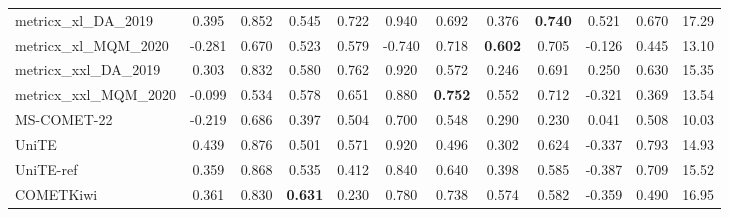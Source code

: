 \documentclass[11pt]{article}
\begin{document}
\begin{sidewaystable*}[ht]
\begin{tabular}{@{}lccccccccccc@{}}
metricx\_xl\_DA\_2019   & \phantom{-}0.395    & \phantom{-}0.852    & \phantom{-}0.545          & \phantom{-}0.722        & \phantom{-}0.940            & \phantom{-}0.692           & \phantom{-}0.376            & \colorbox[HTML]{B2EAB1}{\textbf{\phantom{-}0.740}}                & \phantom{-}0.521          & \phantom{-}0.670       & 17.29      \\
metricx\_xl\_MQM\_2020  & -0.281   & \phantom{-}0.670    & \phantom{-}0.523          & \phantom{-}0.579        & {-}0.740            & \phantom{-}0.718           & \colorbox[HTML]{B2EAB1}{\textbf{\phantom{-}0.602}}            & \phantom{-}0.705                & -0.126         & \phantom{-}0.445       & 13.10      \\
metricx\_xxl\_DA\_2019  & \phantom{-}0.303    & \phantom{-}0.832    & \phantom{-}0.580          & \phantom{-}0.762        & \phantom{-}0.920            & \phantom{-}0.572           & \phantom{-}0.246            & \phantom{-}0.691                & \phantom{-}0.250          & \phantom{-}0.630       & 15.35      \\
metricx\_xxl\_MQM\_2020 & -0.099   & \phantom{-}0.534    & \phantom{-}0.578          & \phantom{-}0.651        & \phantom{-}0.880            & \colorbox[HTML]{B2EAB1}{\textbf{\phantom{-}0.752}}           & \phantom{-}0.552            & \phantom{-}0.712                & -0.321         & \phantom{-}0.369       & 13.54      \\
MS-COMET-22             & -0.219   & \phantom{-}0.686    & \phantom{-}0.397          & \phantom{-}0.504        & \phantom{-}0.700            & \phantom{-}0.548           & \phantom{-}0.290            & \phantom{-}0.230                & \phantom{-}0.041          & \phantom{-}0.508       & 10.03      \\
UniTE                   & \phantom{-}0.439    & \phantom{-}0.876    & \phantom{-}0.501          & \phantom{-}0.571        & \phantom{-}0.920            & \phantom{-}0.496           & \phantom{-}0.302            & \phantom{-}0.624                & -0.337         & \phantom{-}0.793       & 14.93      \\
UniTE-ref               & \phantom{-}0.359    & \phantom{-}0.868    & \phantom{-}0.535          & \phantom{-}0.412        & \phantom{-}0.840            & \phantom{-}0.640           & \phantom{-}0.398            & \phantom{-}0.585                & -0.387         & \phantom{-}0.709       & 15.52      \\
\midrule
COMETKiwi               & \phantom{-}0.361    & \phantom{-}0.830    & \colorbox[HTML]{B2EAB1}{\textbf{\phantom{-}0.631}}          & \phantom{-}0.230        & \phantom{-}0.780            & \phantom{-}0.738           & \phantom{-}0.574            & \phantom{-}0.582                & -0.359         & \phantom{-}0.490       & 16.95      \\

\end{tabular}
\end{sidewaystable*}
\end{document}
